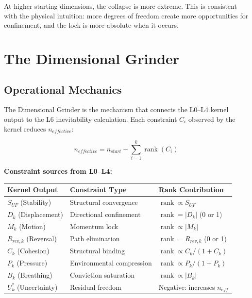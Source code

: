 \documentclass[11pt, a4paper]{article}
\begin{document}
At higher starting dimensions, the collapse is more extreme. This is
consistent with the physical intuition: more degrees of freedom create
more opportunities for confinement, and the lock is more absolute when
it occurs.

\section{The Dimensional Grinder}

\subsection{Operational Mechanics}

The Dimensional Grinder is the mechanism that connects the L0--L4 kernel
output to the L6 inevitability calculation. Each constraint $C_i$ observed
by the kernel reduces $n_{effective}$:

\begin{equation}
  n_{effective} = n_{start} - \sum_{i=1}^{k} \operatorname{rank}(C_i)
\end{equation}

\textbf{Constraint sources from L0--L4:}
\begin{center}
\begin{tabular}{@{}lll@{}}
\toprule
\textbf{Kernel Output} & \textbf{Constraint Type} & \textbf{Rank Contribution} \\
\midrule
$S_{UF}$ (Stability) & Structural convergence & $\operatorname{rank} \propto S_{UF}$ \\
$D_k$ (Displacement) & Directional confinement & $\operatorname{rank} = |D_k|$ (0 or 1) \\
$M_k$ (Motion) & Momentum lock & $\operatorname{rank} \propto |M_k|$ \\
$R_{rev,k}$ (Reversal) & Path elimination & $\operatorname{rank} = R_{rev,k}$ (0 or 1) \\
$C_k$ (Cohesion) & Structural binding & $\operatorname{rank} \propto C_k / (1 + C_k)$ \\
$P_k$ (Pressure) & Environmental compression & $\operatorname{rank} \propto P_k / (1 + P_k)$ \\
$B_k$ (Breathing) & Conviction saturation & $\operatorname{rank} \propto |B_k|$ \\
$U^*_k$ (Uncertainty) & Residual freedom & Negative: increases $n_{eff}$ \\
\bottomrule
\end{tabular}
\end{center}
\end{document}
